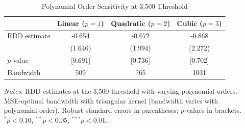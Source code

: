 \begin{table}[t]
\centering
\caption{Polynomial Order Sensitivity at 3,500 Threshold}
\label{tab:polynomial}
\begin{tabular}{lccc}
\hline\hline
 & Linear ($p=1$) & Quadratic ($p=2$) & Cubic ($p=3$) \\
\hline
RDD estimate & -0.654 & -0.672 & -0.868 \\
 & (1.646) & (1.994) & (2.272) \\
$p$-value & [0.691] & [0.736] & [0.702] \\
\hline
Bandwidth & 509 & 765 & 1031 \\
\hline\hline
\end{tabular}
\begin{tablenotes}\small
\item \textit{Notes:} RDD estimates at the 3,500 threshold with varying polynomial orders. MSE-optimal bandwidth with triangular kernel (bandwidth varies with polynomial order). Robust standard errors in parentheses; $p$-values in brackets. $^{*}p<0.10$, $^{**}p<0.05$, $^{***}p<0.01$.
\end{tablenotes}
\end{table}
